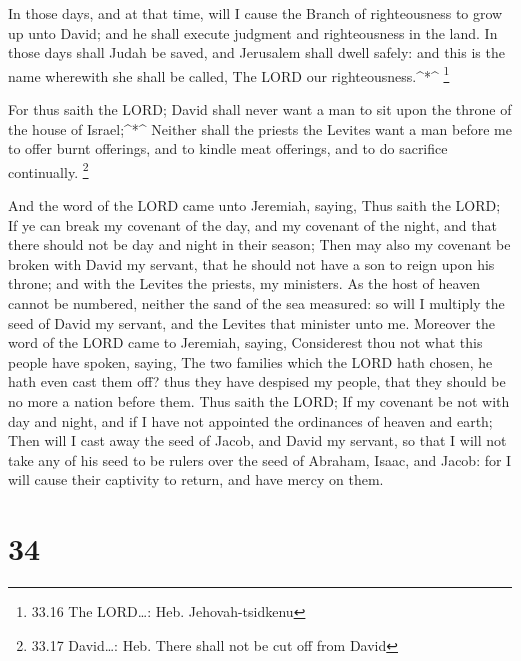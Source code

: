  In those days, and at that time, will I cause the Branch
of righteousness to grow up unto David; and he shall execute judgment
and righteousness in the land.  In those days shall Judah
be saved, and Jerusalem shall dwell safely: and this is the name
wherewith she shall be called, The LORD our righteousness.\^{}*\^{}
\footnote{33.16 The LORD\ldots: Heb. Jehovah-tsidkenu}

 For thus saith the LORD; David shall never want a man to
sit upon the throne of the house of Israel;\^{}*\^{} 
Neither shall the priests the Levites want a man before me to offer
burnt offerings, and to kindle meat offerings, and to do sacrifice
continually. \footnote{33.17 David\ldots: Heb. There shall not be cut
  off from David}

 And the word of the LORD came unto Jeremiah, saying,
 Thus saith the LORD; If ye can break my covenant of the
day, and my covenant of the night, and that there should not be day and
night in their season;  Then may also my covenant be broken
with David my servant, that he should not have a son to reign upon his
throne; and with the Levites the priests, my ministers.  As
the host of heaven cannot be numbered, neither the sand of the sea
measured: so will I multiply the seed of David my servant, and the
Levites that minister unto me.  Moreover the word of the
LORD came to Jeremiah, saying,  Considerest thou not what
this people have spoken, saying, The two families which the LORD hath
chosen, he hath even cast them off? thus they have despised my people,
that they should be no more a nation before them.  Thus
saith the LORD; If my covenant be not with day and night, and if I have
not appointed the ordinances of heaven and earth;  Then
will I cast away the seed of Jacob, and David my servant, so that I will
not take any of his seed to be rulers over the seed of Abraham, Isaac,
and Jacob: for I will cause their captivity to return, and have mercy on
them.

\hypertarget{section-33}{%
\section{34}\label{section-33}}

